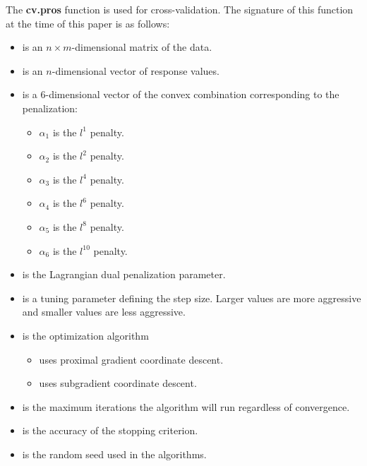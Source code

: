 \documentclass[article]{jss}
\numberwithin{equation}{section}
\begin{document}
The \textbf{cv.pros} function is used for cross-validation.
The signature of this function at the time of this paper is as follows:

\begin{itemize}
\item {} is an $n \times m$-dimensional matrix of the data.

\item {} is an $n$-dimensional vector of response values.

\item {} is a $6$-dimensional vector of the convex combination corresponding to the penalization:
 \begin{itemize}
   \item $\alpha_1$ is the $l^1$ penalty.
   \item $\alpha_2$ is the $l^2$ penalty.
   \item $\alpha_3$ is the $l^4$ penalty.
   \item $\alpha_4$ is the $l^6$ penalty.
   \item $\alpha_5$ is the $l^8$ penalty.
   \item $\alpha_6$ is the $l^{10}$ penalty.
\end{itemize}

\item {} is the Lagrangian dual penalization parameter.

\item {} is a tuning parameter defining the step size. Larger values are more aggressive and smaller values are less aggressive.

\item {} is the optimization algorithm
\begin{itemize}
\item {} uses proximal gradient coordinate descent.
\item {} uses subgradient coordinate descent.
\end{itemize}

\item {} is the maximum iterations the algorithm will run regardless of convergence.

\item {} is the accuracy of the stopping criterion.

\item {} is the random seed used in the algorithms.

\end{itemize}
\end{document}
